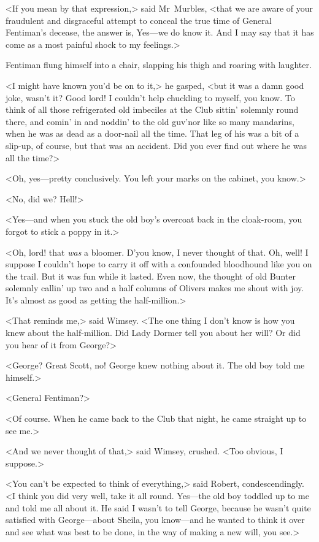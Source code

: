<If you mean by that expression,> said Mr~Murbles, <that we are aware of your fraudulent and disgraceful attempt to conceal the true time of General Fentiman's decease, the answer is, Yes—we do know it. And I may say that it has come as a most painful shock to my feelings.>

Fentiman flung himself into a chair, slapping his thigh and roaring with laughter.

<I might have known you'd be on to it,> he gasped, <but it was a damn good joke, wasn't it? Good lord! I couldn't help chuckling to myself, you know. To think of all those refrigerated old imbeciles at the Club sittin' solemnly round there, and comin' in and noddin' to the old guv'nor like so many mandarins, when he was as dead as a door-nail all the time. That leg of his was a bit of a slip-up, of course, but that was an accident. Did you ever find out where he was all the time?>

<Oh, yes—pretty conclusively. You left your marks on the cabinet, you know.>

<No, did we? Hell!>

<Yes—and when you stuck the old boy's overcoat back in the cloak-room, you forgot to stick a poppy in it.>

<Oh, lord! that \emph{was} a bloomer. D'you know, I never thought of that. Oh, well! I suppose I couldn't hope to carry it off with a confounded bloodhound like you on the trail. But it was fun while it lasted. Even now, the thought of old Bunter solemnly callin' up two and a half columns of Olivers makes me shout with joy. It's almost as good as getting the half-million.>

<That reminds me,> said Wimsey. <The one thing I don't know is how you knew about the half-million. Did Lady Dormer tell you about her will? Or did you hear of it from George?>

<George? Great Scott, no! George knew nothing about it. The old boy told me himself.>

<General Fentiman?>

<Of course. When he came back to the Club that night, he came straight up to see me.>

<And we never thought of that,> said Wimsey, crushed. <Too obvious, I suppose.>

<You can't be expected to think of everything,> said Robert, condescendingly. <I think you did very well, take it all round. Yes—the old boy toddled up to me and told me all about it. He said I wasn't to tell George, because he wasn't quite satisfied with George—about Sheila, you know—and he wanted to think it over and see what was best to be done, in the way of making a new will, you see.>

